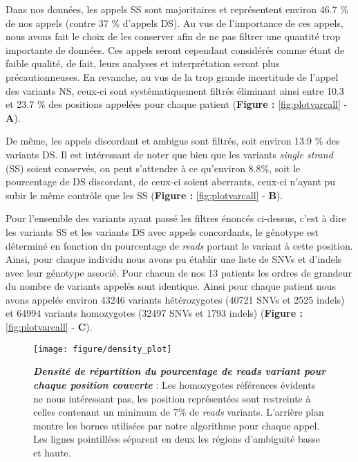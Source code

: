 \documentclass[12pt,twoside]{ugathesis}
\begin{document}
Dans nos données, les appels SS sont majoritaires et représentent
environ 46.7 \% de nos appels (contre 37 \% d'appels DS). Au vus de
l'importance de ces appels, nous avons fait le choix de les conserver
afin de ne pas filtrer une quantité trop importante de données. Ces
appels seront cependant considérés comme étant de faible qualité, de
fait, leurs analyses et interprétation seront plus précautionneuses. En
revanche, au vus de la trop grande incertitude de l'appel des variants
NS, ceux-ci sont systématiquement filtrés éliminant ainsi entre 10.3 et
23.7 \% des positions appelées pour chaque patient (\textbf{Figure :
}\ref{fig:plotvarcall} - \textbf{A}).

De même, les appels discordant et ambigus sont filtrés, soit environ
13.9 \% des variants DS. Il est intéressant de noter que bien que les
variants \emph{single strand} (SS) soient conservés, on peut s'attendre
à ce qu'environ 8.8\%, soit le pourcentage de DS discordant, de ceux-ci
soient aberrants, ceux-ci n'ayant pu subir le même contrôle que les SS
(\textbf{Figure : }\ref{fig:plotvarcall} - \textbf{B}).

Pour l'ensemble des variants ayant passé les filtres énoncés ci-dessus,
c'est à dire les variants SS et les variants DS avec appels concordants,
le génotype est déterminé en fonction du pourcentage de \emph{reads}
portant le variant à cette position. Ainsi, pour chaque individu nous
avons pu établir une liste de SNVs et d'indels avec leur génotype
associé. Pour chacun de nos 13 patients les ordres de grandeur du nombre
de variants appelés sont identique. Ainsi pour chaque patient nous avons
appelés environ 43246 variants hétérozygotes (40721 SNVs et 2525 indels)
et 64994 variants homozygotes (32497 SNVs et 1793 indels)
(\textbf{Figure : }\ref{fig:plotvarcall} - \textbf{C}).

\newpage

\begin{figure}

{\centering \texttt{[image: figure/density\_plot]} 

}

\caption[Densité de répartition du pourcentage de reads variant pour chaque position couverte]{\textbf{\emph{Densité de répartition du pourcentage
de reads variant pour chaque position couverte}} : Les homozygotes
références évidents ne nous intéressant pas, les position représentées
sont restreinte à celles contenant un minimum de 7\% de \emph{reads}
variants. L'arrière plan montre les bornes utilisées par notre
algorithme pour chaque appel. Les lignes pointillées séparent en deux
les régions d'ambiguité basse et haute.}\label{fig:plotdensityvar}
\end{figure}
\end{document}
